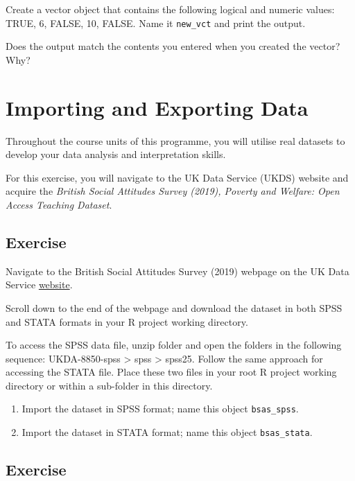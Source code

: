 \documentclass[
]{book}
\providecommand{\tightlist}{%
  \setlength{\itemsep}{0pt}\setlength{\parskip}{0pt}}
\begin{document}
Create a vector object that contains the following logical and numeric values: TRUE, 6, FALSE, 10, FALSE. Name it \texttt{new\_vct} and print the output.

Does the output match the contents you entered when you created the vector? Why?

\hypertarget{importing-and-exporting-data}{%
\section{Importing and Exporting Data}\label{importing-and-exporting-data}}

Throughout the course units of this programme, you will utilise real datasets to develop your data analysis and interpretation skills.

For this exercise, you will navigate to the UK Data Service (UKDS) website and acquire the \textit{British Social Attitudes Survey (2019), Poverty and Welfare: Open Access Teaching Dataset}.

\hypertarget{exercise-5}{%
\subsection{Exercise}\label{exercise-5}}

Navigate to the British Social Attitudes Survey (2019) webpage on the UK Data Service \href{https://beta.ukdataservice.ac.uk/datacatalogue/studies/study?id=8850#!/access-data}{website}.

Scroll down to the end of the webpage and download the dataset in both SPSS and STATA formats in your R project working directory.

To access the SPSS data file, unzip folder and open the folders in the following sequence: UKDA-8850-spss \textgreater{} spss \textgreater{} spss25. Follow the same approach for accessing the STATA file. Place these two files in your root R project working directory or within a sub-folder in this directory.

\begin{enumerate}
\def\labelenumi{\alph{enumi}.}
\tightlist
\item
  Import the dataset in SPSS format; name this object \texttt{bsas\_spss}.
\item
  Import the dataset in STATA format; name this object \texttt{bsas\_stata}.
\end{enumerate}

\hypertarget{exercise-6}{%
\subsection{Exercise}\label{exercise-6}}
\end{document}
